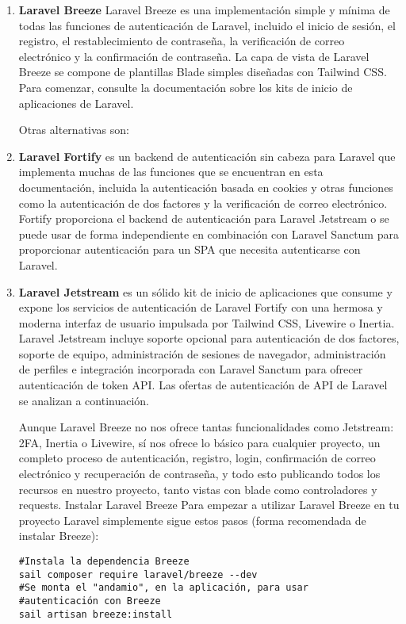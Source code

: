 \documentclass[11pt]{article}
\begin{document}
\begin{enumerate}
\item \textbf{Laravel Breeze}
\label{sec:orgf779fe8}
Laravel Breeze es una implementación simple y mínima de todas las
funciones de autenticación de Laravel, incluido el inicio de sesión,
el registro, el restablecimiento de contraseña, la verificación de
correo electrónico y la confirmación de contraseña. La capa de vista
de Laravel Breeze se compone de plantillas Blade simples diseñadas con
Tailwind CSS. Para comenzar, consulte la documentación sobre los kits
de inicio de aplicaciones de Laravel.

Otras alternativas son:
\item \textbf{Laravel Fortify} es un backend de autenticación sin cabeza para Laravel
\label{sec:org7c1bb7b}
que implementa muchas de las funciones que se encuentran en esta
documentación, incluida la autenticación basada en cookies y otras
funciones como la autenticación de dos factores y la verificación de
correo electrónico. Fortify proporciona el backend de autenticación
para Laravel Jetstream o se puede usar de forma independiente en
combinación con Laravel Sanctum para proporcionar autenticación para
un SPA que necesita autenticarse con Laravel.

\item \textbf{Laravel Jetstream} es un sólido kit de inicio de aplicaciones que
\label{sec:org9a07241}
consume y expone los servicios de autenticación de Laravel Fortify con
una hermosa y moderna interfaz de usuario impulsada por Tailwind CSS,
Livewire o Inertia. Laravel Jetstream incluye soporte opcional para
autenticación de dos factores, soporte de equipo, administración de
sesiones de navegador, administración de perfiles e integración
incorporada con Laravel Sanctum para ofrecer autenticación de token
API. Las ofertas de autenticación de API de Laravel se analizan a
continuación.

Aunque Laravel Breeze no nos ofrece tantas funcionalidades como
Jetstream: 2FA, Inertia o Livewire, sí nos ofrece lo básico para
cualquier proyecto, un completo proceso de autenticación, registro,
login, confirmación de correo electrónico y recuperación de
contraseña, y todo esto publicando todos los recursos en nuestro
proyecto, tanto vistas con blade como controladores y
requests. Instalar Laravel Breeze Para empezar a utilizar Laravel
Breeze en tu proyecto Laravel simplemente sigue estos pasos (forma
recomendada de instalar Breeze):

\begin{verbatim}
#Instala la dependencia Breeze
sail composer require laravel/breeze --dev
#Se monta el "andamio", en la aplicación, para usar
#autenticación con Breeze
sail artisan breeze:install
\end{verbatim}


\end{enumerate}
\end{document}
